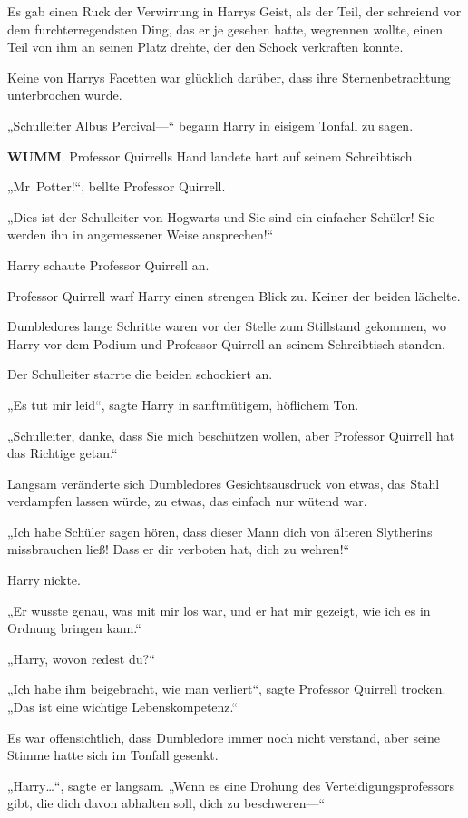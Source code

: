 {Es gab einen Ruck der Verwirrung in Harrys Geist, als der Teil, der schreiend vor dem furchterregendsten Ding, das er je gesehen hatte, wegrennen wollte, einen Teil von ihm an seinen Platz drehte, der den Schock verkraften konnte.

Keine von Harrys Facetten war glücklich darüber, dass ihre Sternenbetrachtung unterbrochen wurde.

„Schulleiter Albus Percival—“ begann Harry in eisigem Tonfall zu sagen.

\textbf{WUMM}. Professor Quirrells Hand landete hart auf seinem Schreibtisch.

„Mr~Potter!“, bellte Professor Quirrell.

„Dies ist der Schulleiter von Hogwarts und Sie sind ein einfacher Schüler! Sie werden ihn in angemessener Weise ansprechen!“

Harry schaute Professor Quirrell an.

Professor Quirrell warf Harry einen strengen Blick zu. Keiner der beiden lächelte.

Dumbledores lange Schritte waren vor der Stelle zum Stillstand gekommen, wo Harry vor dem Podium und Professor Quirrell an seinem Schreibtisch standen.

Der Schulleiter starrte die beiden schockiert an.

„Es tut mir leid“, sagte Harry in sanftmütigem, höflichem Ton.

„Schulleiter, danke, dass Sie mich beschützen wollen, aber Professor Quirrell hat das Richtige getan.“

Langsam veränderte sich Dumbledores Gesichtsausdruck von etwas, das Stahl verdampfen lassen würde, zu etwas, das einfach nur wütend war.

„Ich habe Schüler sagen hören, dass dieser Mann dich von älteren Slytherins missbrauchen ließ! Dass er dir verboten hat, dich zu wehren!“

Harry nickte.

„Er wusste genau, was mit mir los war, und er hat mir gezeigt, wie ich es in Ordnung bringen kann.“

„Harry, wovon redest du?“

„Ich habe ihm beigebracht, wie man verliert“, sagte Professor Quirrell trocken. „Das ist eine wichtige Lebenskompetenz.“

Es war offensichtlich, dass Dumbledore immer noch nicht verstand, aber seine Stimme hatte sich im Tonfall gesenkt.

„Harry…“, sagte er langsam. „Wenn es eine Drohung des Verteidigungsprofessors gibt, die dich davon abhalten soll, dich zu beschweren—“

}
